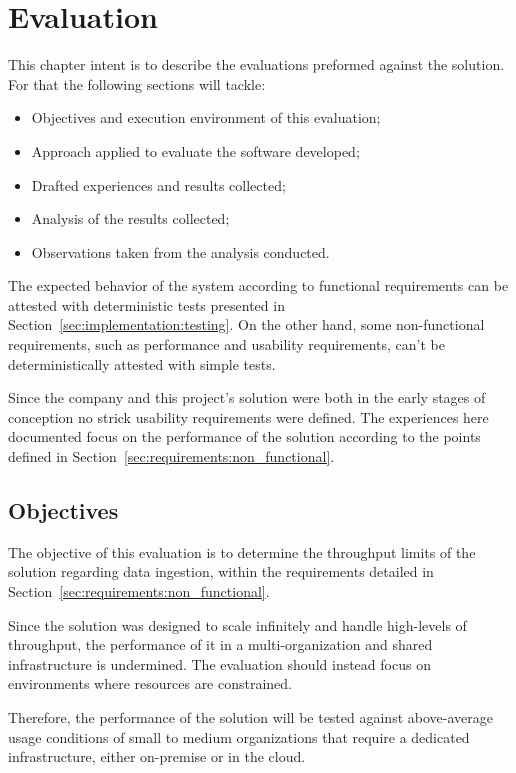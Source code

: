 \chapter{Evaluation}
\label{chap:evaluation}

This chapter intent is to describe the evaluations preformed against the solution. For that the following sections will tackle:

\begin{itemize}
    \item Objectives and execution environment of this evaluation;
    \item Approach applied to evaluate the software developed;
    \item Drafted experiences and results collected;
    \item Analysis of the results collected;
    \item Observations taken from the analysis conducted.
\end{itemize}

The expected behavior of the system according to functional requirements can be attested with deterministic tests presented in Section~\ref{sec:implementation:testing}. On the other hand, some non-functional requirements, such as performance and usability requirements, can't be deterministically attested with simple tests.

Since the company and this project's solution were both in the early stages of conception no strick usability requirements were defined. The experiences here documented focus on the performance of the solution according to the points defined in Section~\ref{sec:requirements:non_functional}.

\section{Objectives}
\label{sec:evaluation:objectives}

The objective of this evaluation is to determine the throughput limits of the solution regarding data ingestion, within the requirements detailed in Section~\ref{sec:requirements:non_functional}.

Since the solution was designed to scale infinitely and handle high-levels of throughput, the performance of it in a multi-organization and shared infrastructure is undermined. The evaluation should instead focus on environments where resources are constrained.

Therefore, the performance of the solution will be tested against above-average usage conditions of small to medium organizations that require a dedicated infrastructure, either on-premise or in the cloud.

